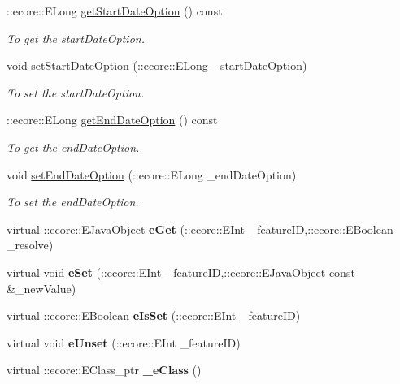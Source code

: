 \begin{DoxyCompactItemize}
::ecore::ELong \hyperlink{classUMS__Data_1_1ListCmdOptions_a15462107f4f8d7a044ce5c5e1f152d62}{getStartDateOption} () const 
\begin{DoxyCompactList}\small\item\em To get the startDateOption. \item\end{DoxyCompactList}\item 
void \hyperlink{classUMS__Data_1_1ListCmdOptions_a78c0d5782e8a400b7ffb9bf3f4b1b893}{setStartDateOption} (::ecore::ELong \_\-startDateOption)
\begin{DoxyCompactList}\small\item\em To set the startDateOption. \item\end{DoxyCompactList}\item 
::ecore::ELong \hyperlink{classUMS__Data_1_1ListCmdOptions_adcbd666615f21378d412f0236d4c82ae}{getEndDateOption} () const 
\begin{DoxyCompactList}\small\item\em To get the endDateOption. \item\end{DoxyCompactList}\item 
void \hyperlink{classUMS__Data_1_1ListCmdOptions_aa92c6b8e2b40b73d9b1e45498a2f3653}{setEndDateOption} (::ecore::ELong \_\-endDateOption)
\begin{DoxyCompactList}\small\item\em To set the endDateOption. \item\end{DoxyCompactList}\item 
\hypertarget{classUMS__Data_1_1ListCmdOptions_aea457c30c56e5c792ca10df8bdcfbc1e}{
virtual ::ecore::EJavaObject {\bfseries eGet} (::ecore::EInt \_\-featureID,::ecore::EBoolean \_\-resolve)}
\label{classUMS__Data_1_1ListCmdOptions_aea457c30c56e5c792ca10df8bdcfbc1e}

\item 
\hypertarget{classUMS__Data_1_1ListCmdOptions_a1dc84bb4ce25934cb5a0707d6f06dffd}{
virtual void {\bfseries eSet} (::ecore::EInt \_\-featureID,::ecore::EJavaObject const \&\_\-newValue)}
\label{classUMS__Data_1_1ListCmdOptions_a1dc84bb4ce25934cb5a0707d6f06dffd}

\item 
\hypertarget{classUMS__Data_1_1ListCmdOptions_a5b1df391e00d83d201c52c60f7de032f}{
virtual ::ecore::EBoolean {\bfseries eIsSet} (::ecore::EInt \_\-featureID)}
\label{classUMS__Data_1_1ListCmdOptions_a5b1df391e00d83d201c52c60f7de032f}

\item 
\hypertarget{classUMS__Data_1_1ListCmdOptions_a0b4e8ba36859b0984f462d3c3020773b}{
virtual void {\bfseries eUnset} (::ecore::EInt \_\-featureID)}
\label{classUMS__Data_1_1ListCmdOptions_a0b4e8ba36859b0984f462d3c3020773b}

\item 
\hypertarget{classUMS__Data_1_1ListCmdOptions_a7ce75776857dddcddba58c4aff871e9d}{
virtual ::ecore::EClass\_\-ptr {\bfseries \_\-eClass} ()}
\label{classUMS__Data_1_1ListCmdOptions_a7ce75776857dddcddba58c4aff871e9d}

\end{DoxyCompactItemize}
